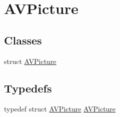 \hypertarget{group__lavc__picture}{}\section{A\+V\+Picture}
\label{group__lavc__picture}
\subsection*{Classes}
\begin{DoxyCompactItemize}
\item 
struct \hyperlink{struct_a_v_picture}{A\+V\+Picture}
\end{DoxyCompactItemize}
\subsection*{Typedefs}
\begin{DoxyCompactItemize}
\item 
typedef struct \hyperlink{struct_a_v_picture}{A\+V\+Picture} \hyperlink{group__lavc__picture_ga39851aa8a2053ff2bafc5b292505fb78}{A\+V\+Picture}
\end{DoxyCompactItemize}
